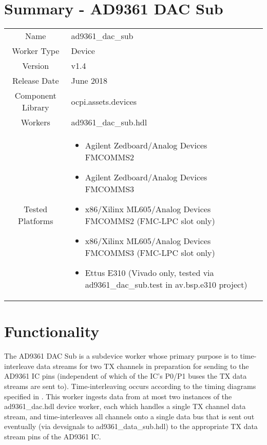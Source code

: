 \documentclass{article}
\author{} %
\date{Version \docVersion} %
\title{\docTitle}
\def\docVersion{1.4}
\def\comp{ad9361\_dac\_sub}
\def\Comp{AD9361 DAC Sub}
\begin{document}
\section*{Summary - \Comp}
\begin{tabular}{|c|M{13.5cm}|}
	\hline
	                  &                  \\
	\hline
	Name              & \comp            \\
	\hline
	Worker Type       & Device           \\
	\hline
	Version           & v\docVersion     \\
	\hline
	Release Date      & June 2018         \\
	\hline
	Component Library & ocpi.assets.devices     \\
	\hline
	Workers           & \comp.hdl        \\
	\hline
	Tested Platforms  &
\begin{itemize}
  \item Agilent Zedboard/Analog Devices FMCOMMS2
  \item Agilent Zedboard/Analog Devices FMCOMMS3
  \item x86/Xilinx ML605/Analog Devices FMCOMMS2 (FMC-LPC slot only)
  \item x86/Xilinx ML605/Analog Devices FMCOMMS3 (FMC-LPC slot only)
  \item Ettus E310 (Vivado only, tested via \comp{}.test in av.bsp.e310 project)
\end{itemize} \\
	\hline
\end{tabular}

\section*{Functionality}
	The \Comp{} is a subdevice worker whose primary purpose is to time-interleave data streams for two TX channels in preparation for sending to the AD9361 IC pins (independent of which of the IC's P0/P1 buses the TX data streams are sent to). Time-interleaving occurs according to the timing diagrams specified in \cite{adi_ug570}. This worker ingests data from at most two instances of the ad9361\_dac.hdl device worker, each which handles a single TX channel data stream, and time-interleaves all channels onto a single data bus that is sent out eventually (via devsignals to ad9361\_data\_sub.hdl\cite{data_sub_comp_datasheet}) to the appropriate TX data stream pins of the AD9361 IC\cite{ad9361}.
\end{document}
